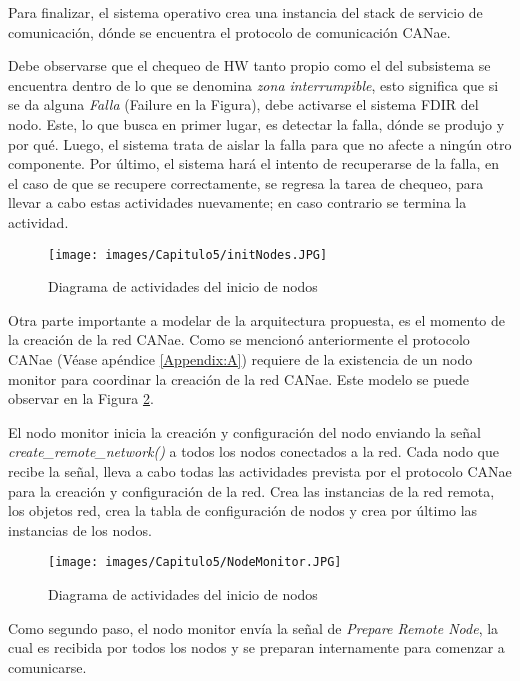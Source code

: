 Para finalizar, el sistema operativo crea una instancia del stack de servicio de
comunicación, dónde se encuentra el protocolo de comunicación CANae.

Debe observarse que el chequeo de \ac{HW} tanto propio como el del
subsistema se encuentra dentro de lo que se denomina \textit{zona interrumpible},
esto significa que si se da alguna \textit{Falla} (Failure en la Figura), debe
activarse el sistema FDIR del nodo. Este, lo que busca en primer lugar,
es detectar la falla, dónde se produjo y por qué. Luego, el sistema trata de
aislar la falla para que no afecte a ningún otro componente. Por último, el
sistema hará el intento de recuperarse de la falla, en el caso de que se
recupere correctamente, se regresa la tarea de chequeo, para
llevar a cabo estas actividades nuevamente; en caso contrario se termina la actividad.

\begin{figure}[h!]
 \centering
 \texttt{[image: images/Capitulo5/initNodes.JPG]}
  \caption{Diagrama de actividades del inicio de nodos}
  \label{fig:initNodes}
\end{figure}

Otra parte importante a modelar de la arquitectura propuesta, es el momento
de la creación de la red CANae. Como se mencionó anteriormente el protocolo
CANae (Véase apéndice \ref{Appendix:A}) requiere de la existencia de un nodo monitor
para coordinar la creación de la red CANae. Este modelo se puede observar
en la Figura \ref{fig:NodeMonitor}.

El nodo monitor inicia la creación y configuración del nodo enviando la
señal \textit{create\_remote\_network()} a todos los nodos conectados a la
red. Cada nodo que recibe la señal, lleva a cabo todas las actividades prevista
por el protocolo CANae para la creación y configuración de la red. Crea las instancias
de la red remota, los objetos red, crea la tabla de configuración de nodos y crea
por último las instancias de los nodos.

\begin{figure}[h!]
 \centering
 \texttt{[image: images/Capitulo5/NodeMonitor.JPG]}
  \caption{Diagrama de actividades del inicio de nodos}
  \label{fig:NodeMonitor}
\end{figure}

Como segundo paso, el nodo monitor envía la señal de \textit{Prepare Remote Node}, la
cual es recibida por todos los nodos y se preparan internamente para comenzar a
comunicarse.

